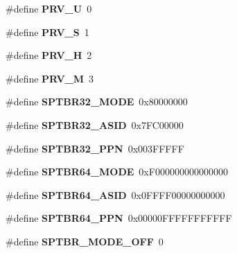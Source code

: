 \begin{DoxyCompactItemize}
\item 
\mbox{\label{riscv-utility_8h_a0584431e22db30065abffb94459477c4}} 
\#define {\bfseries P\+R\+V\+\_\+U}~0
\item 
\mbox{\label{riscv-utility_8h_a3131c9addf7b5ecc1da9f7b0eff9815d}} 
\#define {\bfseries P\+R\+V\+\_\+S}~1
\item 
\mbox{\label{riscv-utility_8h_af11d40d5f172d3095bf39a23ba714552}} 
\#define {\bfseries P\+R\+V\+\_\+H}~2
\item 
\mbox{\label{riscv-utility_8h_afee966c8a48cb4075680eb0cc08ab32e}} 
\#define {\bfseries P\+R\+V\+\_\+M}~3
\item 
\mbox{\label{riscv-utility_8h_a1f2e10bf3e00d249a27b95217ada3aaa}} 
\#define {\bfseries S\+P\+T\+B\+R32\+\_\+\+M\+O\+DE}~0x80000000
\item 
\mbox{\label{riscv-utility_8h_add65137b39dee0d6163f5a90d7398065}} 
\#define {\bfseries S\+P\+T\+B\+R32\+\_\+\+A\+S\+ID}~0x7\+F\+C00000
\item 
\mbox{\label{riscv-utility_8h_a66e9a7168172de16356e7ee2474d1f97}} 
\#define {\bfseries S\+P\+T\+B\+R32\+\_\+\+P\+PN}~0x003\+F\+F\+F\+FF
\item 
\mbox{\label{riscv-utility_8h_ab37eafb87d8fdd12057b8991dead5040}} 
\#define {\bfseries S\+P\+T\+B\+R64\+\_\+\+M\+O\+DE}~0x\+F000000000000000
\item 
\mbox{\label{riscv-utility_8h_ab20d06d378c877cc7fba10b74a8c3573}} 
\#define {\bfseries S\+P\+T\+B\+R64\+\_\+\+A\+S\+ID}~0x0\+F\+F\+F\+F00000000000
\item 
\mbox{\label{riscv-utility_8h_af7b90e4904609fd8ae0fcc16f3b60eb2}} 
\#define {\bfseries S\+P\+T\+B\+R64\+\_\+\+P\+PN}~0x00000\+F\+F\+F\+F\+F\+F\+F\+F\+F\+FF
\item 
\mbox{\label{riscv-utility_8h_acdf6a2142e3e8684c2a399c36e883388}} 
\#define {\bfseries S\+P\+T\+B\+R\+\_\+\+M\+O\+D\+E\+\_\+\+O\+FF}~0

\end{DoxyCompactItemize}
